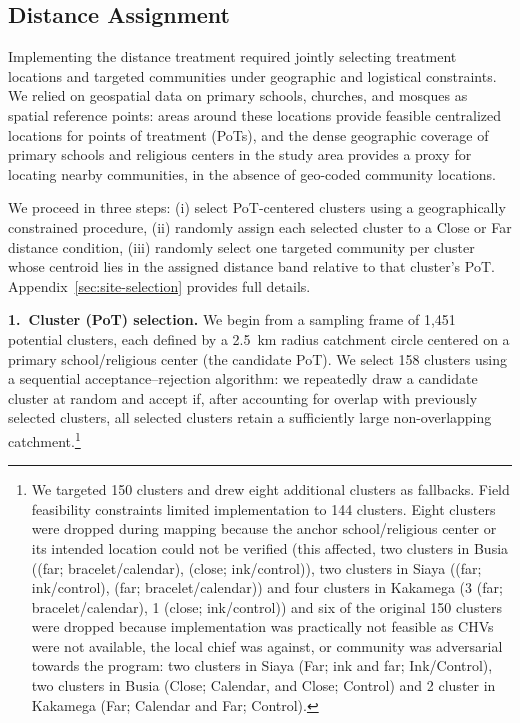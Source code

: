 
\subsection{Distance Assignment}\label{sec:distance-treatment}

Implementing the distance treatment required jointly selecting treatment locations and targeted communities under geographic and logistical constraints. We relied on geospatial data on primary schools, churches, and mosques as spatial reference points: areas around these locations provide feasible centralized locations for points of treatment (PoTs), and the dense geographic coverage of primary schools and religious centers in the study area provides a proxy for locating nearby communities, in the absence of geo-coded community locations.

We proceed in three steps: (i) select PoT-centered clusters using a geographically constrained procedure, (ii) randomly assign each selected cluster to a Close or Far distance condition, (iii) randomly select one targeted community per cluster whose centroid lies in the assigned distance band relative to that cluster's PoT. Appendix~\ref{sec:site-selection} provides full details. %

\vspace{0.4em}
\noindent\textbf{1.\ Cluster (PoT) selection.} We begin from a sampling frame of 1{,}451 potential clusters, each defined by a 2.5~km radius catchment circle centered on a primary school/religious center (the candidate PoT). We select 158 clusters using a sequential acceptance--rejection algorithm: we repeatedly draw a candidate cluster at random and accept if, after accounting for overlap with previously selected clusters, all selected clusters retain a sufficiently large non-overlapping catchment.\footnote{We targeted 150 clusters and drew eight additional clusters as fallbacks. Field feasibility constraints limited implementation to 144 clusters. Eight clusters were dropped during mapping because the anchor school/religious center or its intended location could not be verified (this affected, two clusters in Busia ((far; bracelet/calendar), (close; ink/control)), two clusters in Siaya ((far; ink/control), (far; bracelet/calendar)) and four clusters in Kakamega (3 (far; bracelet/calendar), 1 (close; ink/control)) and six of the original 150 clusters were dropped because implementation was practically not feasible as CHVs were not available, the local chief was against, or community was adversarial towards the program: two clusters in Siaya (Far; ink and far; Ink/Control), two clusters in Busia (Close; Calendar, and Close; Control) and 2 cluster in Kakamega (Far; Calendar and Far; Control).} %

